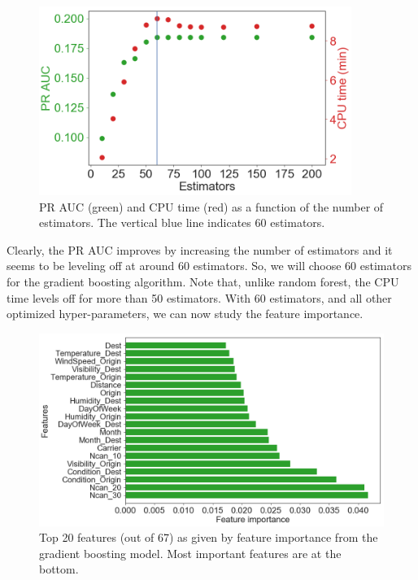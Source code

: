 \documentclass[12pt]{article}
\begin{document}
\begin{figure}[!h]
\begin{center}
\includegraphics[width=4in]{GBC_tree_effects.pdf}
\end{center}
\caption{\label{fig:GBC_trees}
PR AUC (green) and CPU time (red) as a function of the number of estimators. The vertical blue line indicates 60 estimators.}
\end{figure}
Clearly, the PR AUC improves by increasing the number of estimators and it seems to be leveling off at around 60 estimators. So, we will choose 60 estimators for the gradient boosting algorithm. Note that, unlike random forest, the CPU time levels off for more than 50 estimators. With 60 estimators, and all other optimized hyper-parameters, we can now study the feature importance. 
\begin{figure}[!h]
\begin{center}
\includegraphics[width=6in]{GBC_FI.pdf}
\end{center}
\caption{\label{fig:GBC_FI}
Top 20 features (out of 67) as given by feature importance from the gradient boosting model. Most important features are at the bottom.}
\end{figure}
\end{document}
